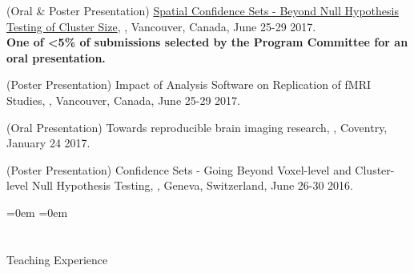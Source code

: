 \documentclass{my_cv}
\begin{document}
(Oral \& Poster Presentation) \href{https://www.pathlms.com/ohbm/courses/5158/sections/7816/video_presentations/78445}{Spatial Confidence Sets - Beyond Null Hypothesis Testing of Cluster Size}, , Vancouver, Canada, June 25-29 2017. \\
\textbf{One of <5\% of submissions selected by the Program Committee for an oral presentation. }

(Poster Presentation) Impact of Analysis Software on Replication of fMRI Studies, , Vancouver, Canada, June 25-29 2017.

(Oral Presentation) Towards reproducible brain imaging research, , Coventry, January 24 2017.

(Poster Presentation) Confidence Sets - Going Beyond Voxel-level and Cluster-level Null Hypothesis Testing, , Geneva, Switzerland, June 26-30 2016.

\leftskip=0em
\parindent=0em

\section{\faPencilSquareO}{Teaching Experience}
\end{document}
